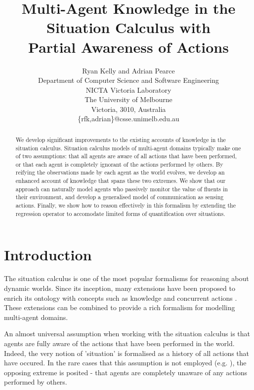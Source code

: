 \documentclass[letterpaper]{article}
\begin{document}
\title{Multi-Agent Knowledge in the Situation Calculus with\\
Partial Awareness of Actions}


\author{Ryan Kelly and Adrian Pearce\\
Department of Computer Science and Software Engineering\\
NICTA Victoria Laboratory\\
The University of Melbourne\\
Victoria, 3010, Australia\\
\{rfk,adrian\}@csse.unimelb.edu.au}

\maketitle

\begin{abstract}
We develop significant improvements to the existing accounts of knowledge
in the situation calculus. Situation calculus models of multi-agent
domains typically make one of two assumptions: that all agents are
aware of all actions that have been performed, or that each agent
is completely ignorant of the actions performed by others. By reifying
the observations made by each agent as the world evolves, we develop
an enhanced account of knowledge that spans these two extremes. We
show that our approach can naturally model agents who passively monitor
the value of fluents in their environment, and develop a generalised
model of communication as sensing actions. Finally, we show how to
reason effectively in this formalism by extending the regression operator
to accomodate limited forms of quantification over situations. 
\end{abstract}

\section{Introduction}

The situation calculus \cite{McCHay69sitcalc,pirri99contributions_sitcalc}
is one of the most popular formalisms for reasoning about dynamic
worlds. Since its inception, many extensions have been proposed to
enrich its ontology with concepts such as knowledge \cite{scherl03sc_knowledge}
and concurrent actions \cite{reiter96sc_nat_conc}. These extensions
can be combined to provide a rich formalism for modelling multi-agent
domains.

An almost universal assumption when working with the situation calculus
is that agents are fully aware of the actions that have been performed
in the world. Indeed, the very notion of 'situation' is formalised
as a history of all actions that have occured. In the rare cases that
this assumption is not employed (e.g. \cite{Lesperance99sitcalc_approach}),
the opposing extreme is posited - that agents are completely unaware
of any actions performed by others.
\end{document}
